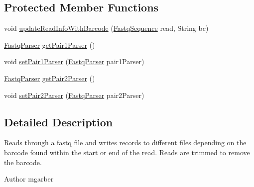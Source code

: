 \subsection*{Protected Member Functions}
\begin{DoxyCompactItemize}
\item 
void \hyperlink{classbroad_1_1pda_1_1seq_1_1fastq_1_1_fastq_splitter_by_barcode_aeee5f1554a4462f13abbb0beef2576fa}{update\+Read\+Info\+With\+Barcode} (\hyperlink{classbroad_1_1pda_1_1seq_1_1fastq_1_1_fastq_sequence}{Fastq\+Sequence} read, String bc)
\item 
\hyperlink{classbroad_1_1pda_1_1seq_1_1fastq_1_1_fastq_parser}{Fastq\+Parser} \hyperlink{classbroad_1_1pda_1_1seq_1_1fastq_1_1_fastq_splitter_by_barcode_a9ece5d69acc4979a5c60929c483f5ede}{get\+Pair1\+Parser} ()
\item 
void \hyperlink{classbroad_1_1pda_1_1seq_1_1fastq_1_1_fastq_splitter_by_barcode_a5c64f9b2979ca3c139a4ffbbd4fcc469}{set\+Pair1\+Parser} (\hyperlink{classbroad_1_1pda_1_1seq_1_1fastq_1_1_fastq_parser}{Fastq\+Parser} pair1\+Parser)
\item 
\hyperlink{classbroad_1_1pda_1_1seq_1_1fastq_1_1_fastq_parser}{Fastq\+Parser} \hyperlink{classbroad_1_1pda_1_1seq_1_1fastq_1_1_fastq_splitter_by_barcode_a7f34e04a652de1adc982f14fc6482eac}{get\+Pair2\+Parser} ()
\item 
void \hyperlink{classbroad_1_1pda_1_1seq_1_1fastq_1_1_fastq_splitter_by_barcode_ae314b8254b7d63a57fac434f66229b62}{set\+Pair2\+Parser} (\hyperlink{classbroad_1_1pda_1_1seq_1_1fastq_1_1_fastq_parser}{Fastq\+Parser} pair2\+Parser)
\end{DoxyCompactItemize}


\subsection{Detailed Description}
Reads through a fastq file and writes records to different files depending on the barcode found within the start or end of the read. Reads are trimmed to remove the barcode. \begin{DoxyAuthor}{Author}
mgarber 
\end{DoxyAuthor}


